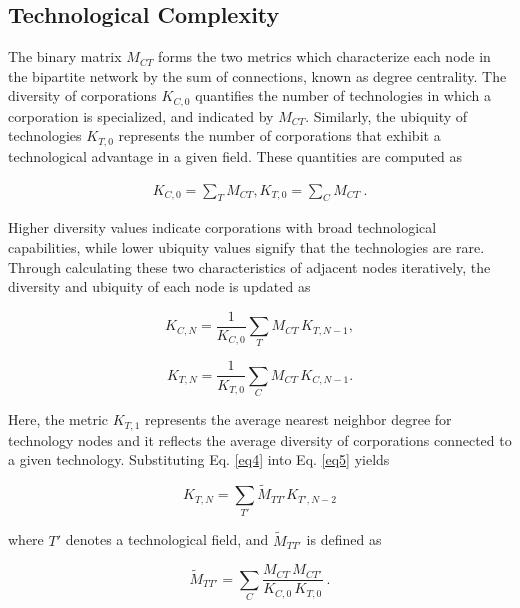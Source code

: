 \subsection*{Technological Complexity}
{}
\label{subsection:technologicalcomplexity}
The binary matrix \(M_{CT}\) forms the two metrics which characterize each node in the bipartite network by the sum of connections, known as degree centrality. The diversity of corporations \(K_{C,0}\) quantifies the number of technologies in which a corporation is specialized, and indicated by $M_{CT}$. 
Similarly, the ubiquity of technologies \(K_{T,0}\) represents the number of corporations that exhibit a technological advantage in a given field. These quantities are computed as

\begin{equation}\label{eq3}
\begin{aligned}
K_{C,0} = \sum_{T} M_{CT},  
K_{T,0} = \sum_{C} M_{CT}~.
\end{aligned}
\end{equation}

Higher diversity values indicate corporations with broad technological capabilities, while lower ubiquity values signify that the technologies are rare. 
Through calculating these two characteristics of adjacent nodes iteratively, the diversity and ubiquity of each node is updated as

\begin{equation}\label{eq4}
K_{C,N} = \frac{1}{K_{C,0}} \sum_{T} M_{CT}\, K_{T,N-1},
\end{equation}

\begin{equation} \label{eq5}
K_{T,N} = \frac{1}{K_{T,0}} \sum_{C} M_{CT}\, K_{C,N-1}.
\end{equation}

Here, the metric \(K_{T,1}\) represents the average nearest neighbor degree for technology nodes and it reflects the average diversity of corporations connected to a given technology.
Substituting Eq. \ref{eq4} into Eq. \ref{eq5} yields

\begin{equation} \label{eq6}
K_{T,N} = \sum_{T'} \widetilde{M}_{TT'} K_{T',N-2}
\end{equation}

where \(T'\) denotes a technological field, and $\widetilde{M}_{TT'}$ is defined as

\begin{equation} \label{eq7}
\widetilde{M}_{TT'} = \sum_{C} \frac{M_{CT}\, M_{CT'}}{K_{C,0}\, K_{T,0}}~.
\end{equation}

